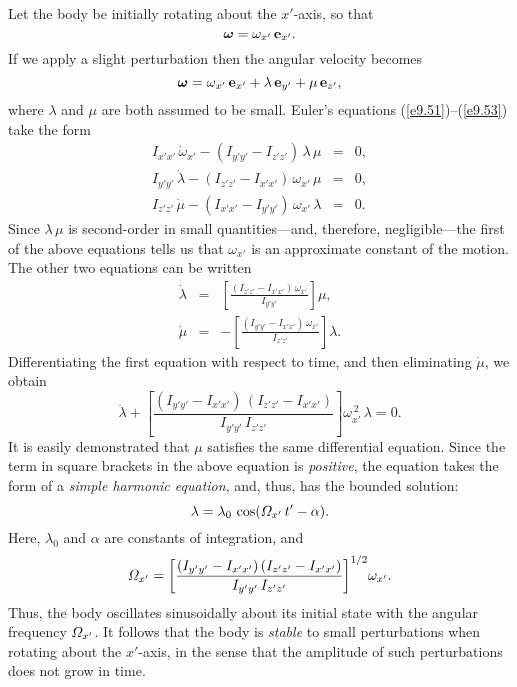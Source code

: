 Let the body be  initially rotating about the $x'$-axis, so that
\begin{equation}
\mbox{\boldmath$\omega$} = \omega_{x'}\,{\bf e}_{x'}.
\end{equation}
If we apply a slight perturbation then the angular velocity becomes
\begin{equation}
\mbox{\boldmath$\omega$} = \omega_{x'}\,{\bf e}_{x'} + \lambda\,{\bf e}_{y'} + \mu\,{\bf e}_{z'},
\end{equation}
where $\lambda$ and $\mu$ are both assumed to be small.
Euler's equations (\ref{e9.51})--(\ref{e9.53}) take the
form
\begin{eqnarray}
I_{x'x'}\,\dot{\omega}_{x'} - (I_{y'y'}-I_{z'z'})\,\lambda\,\mu&=& 0,\\[0.5ex]
I_{y'y'}\,\dot{\lambda} - (I_{z'z'}-I_{x'x'})\,\omega_{x'}\,\mu &=& 0,\\[0.5ex]
I_{z'z'} \,\dot{\mu} - (I_{x'x'}-I_{y'y'})\,\omega_{x'}\,\lambda&=& 0.
\end{eqnarray}
Since $\lambda\,\mu$ is second-order in small quantities---and, therefore, negligible---the first of the above equations tells us that $\omega_{x'}$
is an approximate constant of the motion. The other two equations
can be written
\begin{eqnarray}
\dot{\lambda} &=& \left[\frac{(I_{z'z'}-I_{x'x'})\,\omega_{x'}}{I_{y'y'}}\right]\mu,\\[0.5ex]
\dot{\mu} &=& - \left[\frac{(I_{y'y'}-I_{x'x'})\,\omega_{x'}}{I_{z'z'}}\right]\lambda.
\end{eqnarray}
Differentiating the first equation with respect to time, and then eliminating
$\dot{\mu}$, we obtain
\begin{equation}
\ddot{\lambda} + \left[\frac{(I_{y'y'}-I_{x'x'})\,(I_{z'z'}-I_{x'x'})}{I_{y'y'}\,I_{z'z'}}\right]\omega_{x'}^{\,2} \,\lambda = 0.
\end{equation}
It is easily demonstrated that $\mu$ satisfies the same differential equation.
Since the term in square brackets in the above equation is {\em positive},
the equation takes the form of a {\em simple harmonic equation}, and, thus,
has the bounded solution:
\begin{equation}
\lambda = \lambda_0 \,\cos({\mit\Omega}_{x'}\,t' - \alpha).
\end{equation}
Here, $\lambda_0$ and $\alpha$ are constants of integration, and
\begin{equation}
{\mit\Omega}_{x'} = \left[\frac{(I_{y'y'}-I_{x'x'})\,(I_{z'z'}-I_{x'x'})}{I_{y'y'}\,I_{z'z'}}\right]^{1/2}\! \omega_{x'}.
\end{equation}
Thus, the body oscillates sinusoidally about its initial state
with the angular frequency ${\mit\Omega}_{x'}$.
It follows that  the body  is {\em stable}\/ to small perturbations
when rotating about the $x'$-axis, in the sense that the amplitude of
such perturbations does not grow in time.

